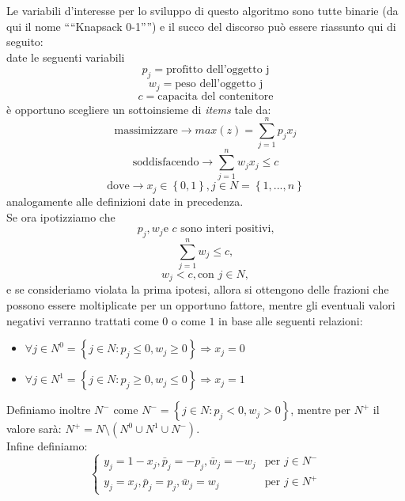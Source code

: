 \documentclass[12pt,a4paper,openright,twoside]{report}
\begin{document}
Le variabili d'interesse per lo sviluppo di questo algoritmo sono tutte binarie (da qui il nome "`"`Knapsack 0-1"'"') e il succo del discorso pu\`{o} essere riassunto qui di seguito:\\
date le seguenti variabili
$$p_{j} = \mbox{profitto dell'oggetto j}$$ $$w_{j} = \mbox{peso dell'oggetto j}$$ $$c = \mbox{capacita del contenitore}$$
\`{e} opportuno scegliere un sottoinsieme di \textit{items} tale da:
\begin{equation}\label{eq1} \mbox{massimizzare} \longrightarrow max(z) = \sum^{n}_{j=1}p_{j}x_{j} \end{equation}
\begin{equation}\label{eq2} \mbox{soddisfacendo} \longrightarrow \sum^{n}_{j=1}w_{j}x_{j} \leq c \end{equation}
\begin{equation}\label{eq3} \mbox{dove} \longrightarrow x_{j}\in \left\lbrace 0,1\right\rbrace , j \in N =\left\lbrace1,...,n\right\rbrace \end{equation}
analogamente alle definizioni date in precedenza.\\
Se ora ipotizziamo che
\begin{equation}\label{eq4} p_{j}, w_{j} \mbox{e } c \mbox{ sono interi positivi,} \end{equation}
\begin{equation}\label{eq5} \sum^{n}_{j=1}w_{j}\leq c, \end{equation}
\begin{equation}\label{eq6} w_{j} < c , \mbox{con } j \in N, \end{equation}
e se consideriamo violata la prima ipotesi, allora si ottengono delle frazioni che possono essere moltiplicate per un opportuno fattore, mentre gli eventuali valori negativi verranno trattati come $0$ o come $1$ in base alle seguenti relazioni:
\begin{itemize}
\item $\forall j \in N^{0} = \left\lbrace j \in N : p_{j} \leq 0, w_{j} \geq 0 \right\rbrace \Longrightarrow x_{j}=0$
\item $\forall j \in N^{1} = \left\lbrace j \in N : p_{j} \geq 0, w_{j} \leq 0 \right\rbrace \Longrightarrow x_{j}=1$
\end{itemize}
Definiamo inoltre $N^{-}$ come $N^{-} = \left\lbrace j\in N : p_{j}<0, w_{j}>0\right\rbrace$, mentre per $N^{+}$ il valore sar\`{a}: $N^{+}= N \setminus (N^{0}\cup N^{1}\cup N^{-})$.\\
Infine definiamo:
$$ 
\left\{
\begin{array}{ll}
y_{j} = 1 - x_{j},  \bar{p}_{j} = - p_{j}, \bar{w}_{j} = - w_{j} & \mbox{per }  j \in N^- \\
y_{j} = x_{j}, \bar{p}_{j} = p_{j}, \bar{w}_{j}=w_{j} & \mbox{per }  j \in N^+
\end{array}
\right.
$$
\end{document}
